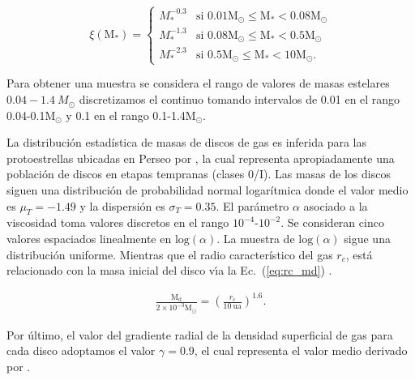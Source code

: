 \documentclass[baaa]{baaa}
\begin{document}
\begin{equation}

    \xi (\text{M}_{*}) = 

   \begin{cases} 

      M^{-0.3}_{*}              & \mbox{si } 0.01\text{M}_{\odot}\leq \text{M}_{*}< 0.08\text{M}_{\odot}   \\

      M^{-1.3}_{*}              & \mbox{si } 0.08\text{M}_{\odot}\leq \text{M}_{*}< 0.5\text{M}_{\odot}   \\

      M^{-2.3}_{*}              & \mbox{si } 0.5\text{M}_{\odot}\leq \text{M}_{*}< 10\text{M}_{\odot}.

   \end{cases}

\end{equation}

Para obtener una muestra se considera el rango de valores de masas estelares $0.04-1.4~M_{\odot}$ discretizamos el continuo tomando intervalos de 0.01 en el rango 0.04-0.1$\mathrm{M}_{\odot}$ y 0.1 en el rango 0.1-1.4$\mathrm{M}_{\odot}$.



La distribución estadística de masas de discos de gas es inferida para las protoestrellas ubicadas en Perseo por \cite{tychoniec2018vla}, la cual representa apropiadamente una población de discos en etapas tempranas (clases 0/I). Las masas de los discos siguen una distribución de probabilidad normal logarítmica donde el valor medio es $\mu_T = -1.49$ y la dispersión es $\sigma_T = 0.35$. El par\'ametro $\alpha$ asociado a la viscosidad toma valores discretos en el rango $10^{-4}$-$10^{-2}$. Se consideran cinco valores espaciados linealmente en  $\mathrm{log}(\alpha)$. La muestra de $\mathrm{log}(\alpha)$ sigue una distribución uniforme. Mientras que el radio característico del gas $r_{c}$, est\'a relacionado con la masa inicial del disco v\'{\i}a la Ec.~(\ref{eq:rc_md}) \citep{andrews2010protoplanetary}.

\begin{align}

    \frac{\text{M}_{\text{d}}}{2 \times 10^{-3} \mathrm{M}_{\odot}} = \left( \frac{r_{c}}{10~\text{ua}}\right)^{1.6}. 

    \label{eq:rc_md}

\end{align}

Por \'ultimo, el valor del gradiente radial de la densidad superficial de gas para cada disco adoptamos el valor $\gamma=0.9$, el cual representa el valor medio derivado por \cite{Andrews_2010}. 
\end{document}
